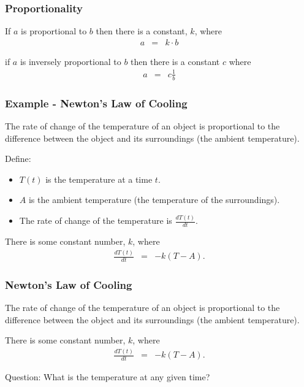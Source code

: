 \begin{frame}
  \frametitle{Proportionality}
  
  If $a$ is proportional to $b$ then there is a constant, $k$, where 
  \begin{eqnarray*}
    a  & = & k \cdot b
  \end{eqnarray*}

  if $a$ is inversely proportional to $b$ then there is a constant $c$
  where 
  \begin{eqnarray*}
    a & = & c \frac{1}{b}
  \end{eqnarray*}
\end{frame}

\begin{frame}
  \frametitle{Example - Newton's Law of Cooling}

  The rate of change of the temperature of an object is proportional
  to the difference between the object and its surroundings (the
  ambient temperature).

  {

    Define:
    \begin{itemize}
    \item $T(t)$ is the temperature at a time $t$.
    \item $A$ is the ambient temperature (the temperature of the
      surroundings).
    \item The rate of change of the temperature is $\frac{dT(t)}{dt}$.
    \end{itemize}

  }

  {

    There is some constant number, $k$, where 
    \begin{eqnarray*}
      \frac{dT(t)}{dt} & = & -k (T-A).
    \end{eqnarray*}

  }


\end{frame}


\begin{frame}
  \frametitle{Newton's Law of Cooling}

  The rate of change of the temperature of an object is proportional
  to the difference between the object and its surroundings (the
  ambient temperature).

    There is some constant number, $k$, where 
    \begin{eqnarray*}
      \frac{dT(t)}{dt} & = & -k (T-A).
    \end{eqnarray*}

    Question: What is the temperature at any given time?

\end{frame}


